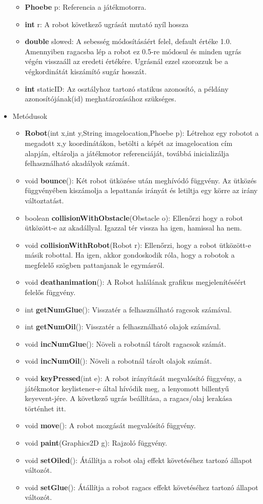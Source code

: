 \begin{itemize}
\begin{itemize}
    	\item \textbf{Phoebe} p: Referencia a játékmotorra.
    	\item \textbf{int} r: A robot következő ugrását mutató nyíl hossza
    	\item \textbf{double} slowed: A sebesség módosításáért felel, default értéke 1.0. Amennyiben ragacsba lép a robot ez 0.5-re módosul és minden ugrás végén visszaáll az eredeti értékére. Ugrásnál ezzel szorozzuk be a végkordinátát kiszámító sugár hosszát.
		\item \textbf{int} staticID: Az osztályhoz tartozó statikus azonosító, a példány azonosítójának(id) meghatározásához szükséges.
\end{itemize}
\item Metódusok

	\begin{itemize}
		\item \textbf{Robot}(int x,int y,String imagelocation,Phoebe p): Létrehoz egy robotot a megadott x,y koordinátákon, betölti a képét az imagelocation cím alapján, eltárolja a játékmotor referenciáját, továbbá inicializálja felhasználható akadályok számát.
		\item void \textbf{bounce}(): Két robot ütközése után meghívódó függvény. Az ütközés függvényében kiszámolja a lepattanás irányát és letiltja egy körre az irány változtatást.
		\item boolean \textbf{collisionWithObstacle}(Obstacle o): Ellenőrzi hogy a robot ütközött-e az akadállyal. Igazzal tér vissza ha igen, hamissal ha nem.
		\item void \textbf{collisionWithRobot}(Robot r): Ellenőrzi, hogy a robot ütközött-e másik robottal. Ha igen, akkor gondoskodik róla, hogy a robotok a megfelelő szögben pattanjanak le egymásról.
		\item void \textbf{deathanimation}(): A Robot halálának grafikus megjelenítéséért felelős függvény.
		\item int \textbf{getNumGlue}(): Visszatér a felhasználható ragcsok számával.
		\item int \textbf{getNumOil}(): Visszatér a felhasználható olajok számával.
		\item void \textbf{incNumGlue}(): Növeli a robotnál tárolt ragacsok számát.
		\item void \textbf{incNumOil}(): Növeli a robotnál tárolt olajok számát.
		\item void \textbf{keyPressed}(int e): A robot irányítását megvalósító függvény, a játékmotor keylistener-e által hívódik meg, a lenyomott billentyű keyevent-jére. A következő ugrás beállítása, a ragacs/olaj lerakása történhet itt.
		\item void \textbf{move}(): A robot mozgását megvalósító függvény.
		\item void \textbf{paint}(Graphics2D g): Rajzoló függvény.
		\item void \textbf{setOiled}(): Átállítja a robot olaj effekt követéséhez tartozó állapot változót.
		\item void \textbf{setGlue}(): Átállítja a robot ragacs effekt követéséhez tartozó állapot változót.


\end{itemize}
\end{itemize}
